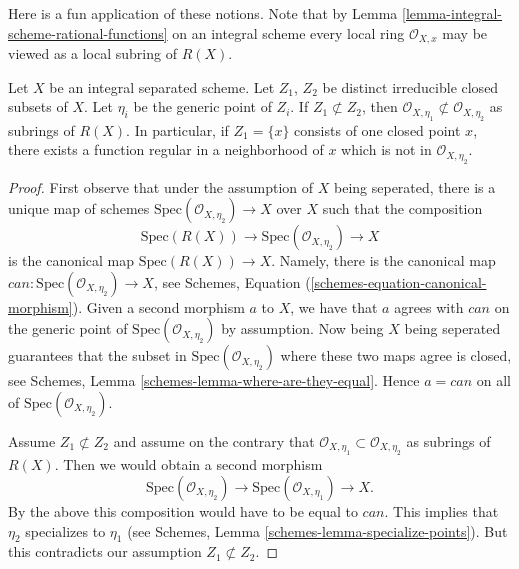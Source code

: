 \noindent
Here is a fun application of these notions.
Note that by Lemma \ref{lemma-integral-scheme-rational-functions}
on an integral scheme every local ring $\mathcal{O}_{X, x}$ may be viewed
as a local subring of $R(X)$.

\begin{lemma}
\label{lemma-distinct-local-rings}
Let $X$ be an integral separated scheme.
Let $Z_1$, $Z_2$ be distinct irreducible closed subsets of $X$.
Let $\eta_i$ be the generic point of $Z_i$.
If $Z_1 \not\subset Z_2$, then
$\mathcal{O}_{X, \eta_1} \not \subset \mathcal{O}_{X, \eta_2}$
as subrings of $R(X)$.
In particular, if $Z_1 = \{x\}$ consists of one closed point $x$,
there exists a function regular in a neighborhood of $x$
which is not in $\mathcal{O}_{X, \eta_{2}}$.
\end{lemma}

\begin{proof}
First observe that under the assumption of $X$ being seperated,
there is a unique map of schemes
$\text{Spec}(\mathcal{O}_{X, \eta_2}) \to X$ over $X$
such that the composition
$$
\text{Spec}(R(X)) \longrightarrow
\text{Spec}(\mathcal{O}_{X, \eta_2}) \longrightarrow X
$$
is the canonical map $\text{Spec}(R(X)) \to X$.
Namely, there is the canonical map
$can : \text{Spec}(\mathcal{O}_{X, \eta_2}) \to X$, see
Schemes, Equation (\ref{schemes-equation-canonical-morphism}).
Given a second morphism $a$ to $X$, we have that $a$ agrees with $can$
on the generic point of
$\text{Spec}(\mathcal{O}_{X,\eta_2})$ by assumption.
Now being $X$ being seperated guarantees that the subset in
$\text{Spec}(\mathcal{O}_{X,\eta_2})$ where
these two maps agree is closed, see
Schemes, Lemma \ref{schemes-lemma-where-are-they-equal}.
Hence $a = can$ on all of $\text{Spec}(\mathcal{O}_{X,\eta_2})$.

\medskip\noindent
Assume $Z_1 \not \subset Z_2$ and assume on the contrary that
$\mathcal{O}_{X,\eta_{1}} \subset \mathcal{O}_{X,\eta_{2}}$
as subrings of $R(X)$. Then we would obtain a second morphism
$$
\text{Spec}(\mathcal{O}_{X,\eta_{2}}) \longrightarrow
\text{Spec}(\mathcal{O}_{X,\eta_{1}}) \longrightarrow
X.
$$
By the above this composition would have to be equal to $can$.
This implies that $\eta_2$ specializes to $\eta_1$ (see
Schemes, Lemma \ref{schemes-lemma-specialize-points}).
But this contradicts our assumption $Z_1 \not \subset Z_2$.
\end{proof}







